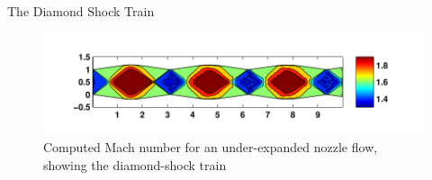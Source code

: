 \documentclass{beamer}
\begin{document}
\begin{frame}{The Diamond Shock Train}
\begin{figure}[htbp]
   \centering
   \includegraphics[width=\textwidth]{diamond_shock_train.pdf}
   \caption{Computed Mach number for an under-expanded nozzle flow,
     showing the diamond-shock train}
   \label{fig:nozzle_flow}
\end{figure}
\end{frame}

\end{document}
